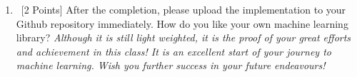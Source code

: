 \documentclass[12pt, fullpage,letterpaper]{article}
\begin{document}
\begin{enumerate}
\begin{enumerate}
\end{enumerate} 

	\item~[2 Points]  After the completion, please upload the implementation to your Github repository immediately.  How do you like your own machine learning library? \textit{Although it is still light weighted, it is the proof of  your great efforts and achievement  in this class! It is an excellent start of your journey to machine learning.  Wish you further success in your future endeavours!}
\end{enumerate}
\end{document}
